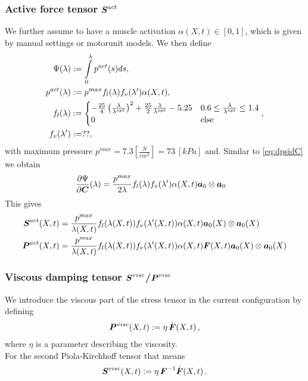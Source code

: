 \subsubsection{Active force tensor $\boldsymbol{S}^{act}$}
We further assume to have a muscle activation $\alpha(X,t) \in [0,1]$, which is given by manual settings or motorunit models.
We then define
\begin{align}
	\Psi(\lambda) &:= \int\limits_{0}^{\lambda} p^{act}(s)ds,\nonumber\\
	p^{act}(\lambda) &:= p^{max}f_l(\lambda)f_v(\lambda')\alpha(X,t),\nonumber\\
	f_l(\lambda) &:= \begin{cases}
		-\frac{25}{4}\left(\frac{\lambda}{\lambda^{opt}}\right)^2 + \frac{25}{2}\frac{\lambda}{\lambda^{opt}} - 5.25 & 0.6 \leq \frac{\lambda}{\lambda^{opt}} \leq 1.4\\ 
		0 & \text{else}
	\end{cases} \label{def:fl},\\
	f_v(\lambda') &:= ??,
\end{align}
with maximum pressure $p^{max} = 7.3 \left[\frac{N}{cm^2}\right] = 73~[kPa]$ and.
Similar to \eqref{eq:dpsidC} we obtain
\begin{align}
	\frac{\partial \Psi}{\partial \boldsymbol{C}}(\lambda) &= \frac{p^{max}}{2\lambda}f_l(\lambda)f_v(\lambda')\alpha(X,t)\boldsymbol{a}_0\otimes\boldsymbol{a}_0
\end{align}
This gives
\begin{align}
	\boldsymbol{S}^{act}(X,t) &= \frac{p^{max}}{\lambda(X,t)}f_l(\lambda(X,t))f_v(\lambda'(X,t))\alpha(X,t)\boldsymbol{a}_0(X)\otimes\boldsymbol{a}_0(X)\\
	\boldsymbol{P}^{act}(X,t) &= \frac{p^{max}}{\lambda(X,t)}f_l(\lambda(X,t))f_v(\lambda'(X,t))\alpha(X,t)\boldsymbol{F}(X,t)\boldsymbol{a}_0(X)\otimes\boldsymbol{a}_0(X)
\end{align}

\subsubsection{Viscous damping tensor $\boldsymbol{S}^{visc}$/$\boldsymbol{P}^{visc}$}
We introduce the viscous part of the stress tensor in the current configuration by defining
\begin{align}
\boldsymbol{P}^{visc}(X,t) := \eta\,\dot{\boldsymbol{F}}(X,t) \,,
\end{align}
where $\eta$ is a parameter describing the viscosity. 
\\
For the second Piola-Kirchhoff tensor that means
\begin{align}
\boldsymbol{S}^{visc}(X,t) := \eta\,\boldsymbol{F}^{-1}\dot{\boldsymbol{F}}(X,t) \,.
\end{align}

